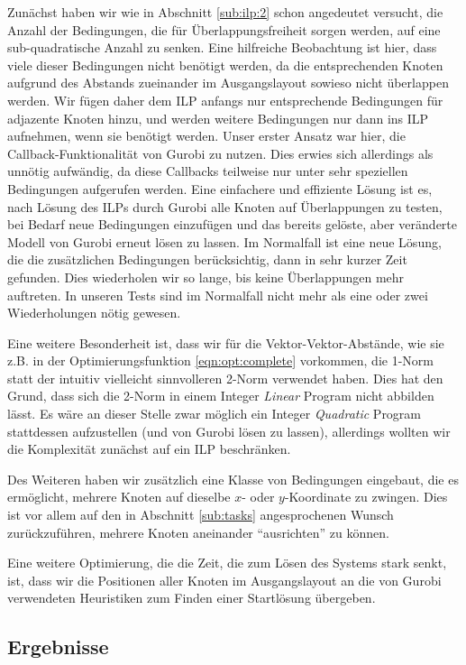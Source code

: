 Zunächst haben wir wie in Abschnitt \ref{sub:ilp:2} schon angedeutet versucht, die Anzahl der Bedingungen, die für Überlappungsfreiheit sorgen werden, auf eine sub-quadratische Anzahl zu senken. Eine hilfreiche Beobachtung ist hier, dass viele dieser Bedingungen nicht benötigt werden, da die entsprechenden Knoten aufgrund des Abstands zueinander im Ausgangslayout sowieso nicht überlappen werden. Wir fügen daher dem ILP anfangs nur entsprechende Bedingungen für adjazente Knoten hinzu, und werden weitere Bedingungen nur dann ins ILP aufnehmen, wenn sie benötigt werden. Unser erster Ansatz war hier, die Callback-Funktionalität von Gurobi zu nutzen. Dies erwies sich allerdings als unnötig aufwändig, da diese Callbacks teilweise nur unter sehr speziellen Bedingungen aufgerufen werden. Eine einfachere und effiziente Lösung ist es, nach Lösung des ILPs durch Gurobi alle Knoten auf Überlappungen zu testen, bei Bedarf neue Bedingungen einzufügen und das bereits gelöste, aber veränderte Modell von Gurobi erneut lösen zu lassen. Im Normalfall ist eine neue Lösung, die die zusätzlichen Bedingungen berücksichtig, dann in sehr kurzer Zeit gefunden. Dies wiederholen wir so lange, bis keine Überlappungen mehr auftreten. In unseren Tests sind im Normalfall nicht mehr als eine oder zwei Wiederholungen nötig gewesen.

Eine weitere Besonderheit ist, dass wir für die Vektor-Vektor-Abstände, wie sie z.B. in der Optimierungsfunktion \ref{eqn:opt:complete} vorkommen, die 1-Norm statt der intuitiv vielleicht sinnvolleren 2-Norm verwendet haben. Dies hat den Grund, dass sich die 2-Norm in einem Integer \textit{Linear} Program nicht abbilden lässt. Es wäre an dieser Stelle zwar möglich ein Integer \textit{Quadratic} Program stattdessen aufzustellen (und von Gurobi lösen zu lassen), allerdings wollten wir die Komplexität zunächst auf ein ILP beschränken.

Des Weiteren haben wir zusätzlich eine Klasse von Bedingungen eingebaut, die es ermöglicht, mehrere Knoten auf dieselbe $x$- oder $y$-Koordinate zu zwingen. Dies ist vor allem auf den in Abschnitt \ref{sub:tasks} angesprochenen Wunsch zurückzuführen, mehrere Knoten aneinander "`ausrichten"' zu können.

Eine weitere Optimierung, die die Zeit, die zum Lösen des Systems stark senkt, ist, dass wir die Positionen aller Knoten im Ausgangslayout an die von Gurobi verwendeten Heuristiken zum Finden einer Startlösung übergeben.

\subsection{Ergebnisse}

